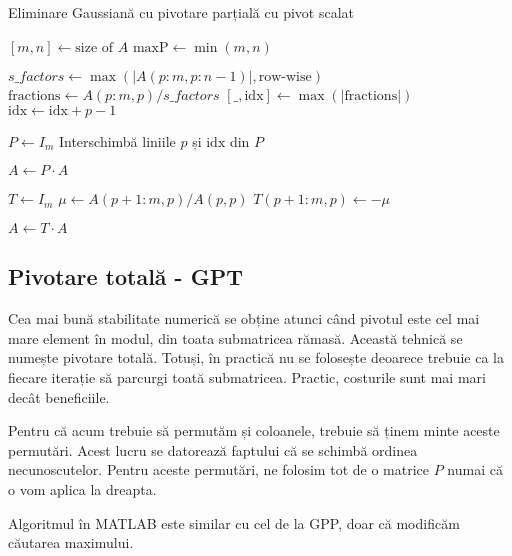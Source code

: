 \documentclass{exam}
\newcommand{\octavescript}[2]{
	
}
\begin{document}
\newpage
\begin{algorithm}
	\caption{Eliminare Gaussiană cu pivotare parțială cu pivot scalat}
	\begin{algorithmic}[1]
		\State \( [m, n] \gets \text{size of } A \)
		\State \( \text{maxP} \gets \min(m, n) \) 

		\State \( s\_factors \gets \max(|A(p:m, p:n-1)|, \text{row-wise}) \) 
		\State \( \text{fractions} \gets A(p:m, p) / s\_factors \) 
		\State \( [\_, \text{idx}] \gets \max(|\text{fractions}|) \) 
		\State \( \text{idx} \gets \text{idx} + p - 1 \) 

		\State \( P \gets I_m \) 
		\State Interschimbă liniile \( p \) și \( \text{idx} \) din \( P \)

		\State \( A \gets P \cdot A \) 

		\State \( T \gets I_m \) 
		\State \( \mu \gets A(p+1:m, p) / A(p, p) \) 
		\State \( T(p+1:m, p) \gets -\mu \) 

		\State \( A \gets T \cdot A \) 
		\EndFor
	\end{algorithmic}
\end{algorithm}

\subsection{Pivotare totală - GPT}

Cea mai bună stabilitate numerică se obține atunci când pivotul este cel
mai mare element în modul, din toata submatricea rămasă. Această tehnică se
numește pivotare totală. Totuși, în practică nu se folosește deoarece trebuie
ca la fiecare iterație să parcurgi toată submatricea. Practic, costurile
sunt mai mari decât beneficiile.

Pentru că acum trebuie să permutăm și coloanele, trebuie să ținem minte
aceste permutări. Acest lucru se datorează faptului că se schimbă ordinea
necunoscutelor. Pentru aceste permutări, ne folosim tot de o matrice $P$ numai
că o vom aplica la dreapta.

Algoritmul în MATLAB este similar cu cel de la GPP, doar că modificăm
căutarea maximului.
\end{document}
